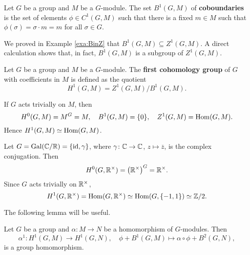 \begin{definition}
    Let $G$ be a group and $M$ be a $G$-module. The set
    $B^1(G,M)$ of \textbf{coboundaries} is the set 
    of elements $\phi\in C^1(G,M)$ such that there is a fixed 
    $m\in M$ such that
    $\phi(\sigma)=\sigma\cdot m=m$ for all $\sigma\in G$.
\end{definition}

We proved in Example \ref{exa:BinZ} that  
$B^1(G,M)\subseteq Z^1(G,M)$. A direct calculation shows that, in fact, 
$B^1(G,M)$ is a subgroup of $Z^1(G,M)$. 

\begin{definition}
    Let $G$ be a group and $M$ be a $G$-module. The 
    \textbf{first cohomology group} of $G$ with coefficients
    in $M$ is defined as the quotient
    \[
    H^1(G,M)=Z^1(G,M)/B^1(G,M).
    \]
\end{definition}

\begin{example}
    If $G$ acts trivially on $M$, then 
    \[
    H^0(G,M)=M^G=M,
    \quad 
    B^1(G,M)=\{0\},
    \quad 
    Z^1(G,M)=\operatorname{Hom}(G,M).
    \]
    Hence 
    $H^1(G,M)\simeq\operatorname{Hom}(G,M)$.
\end{example}

\begin{example}
    Let $G=\operatorname{Gal}(\mathbb{C}/\mathbb{R})=\{\operatorname{id},\gamma\}$, where $\gamma\colon\mathbb{C}\to\mathbb{C}$, $z\mapsto\overline{z}$, is the complex conjugation. Then
    \[
    H^0(G,\mathbb{R}^\times)=\left(\mathbb{R}^\times\right)^G=\mathbb{R}^\times.
    \]
    Since $G$ acts trivially on $\mathbb{R}^\times$, 
    \[
    H^1(G,\mathbb{R}^\times)=\operatorname{Hom}(G,\mathbb{R}^\times)\simeq\operatorname{Hom}(G,\{-1,1\})\simeq\mathbb{Z}/2.
    \]
\end{example}

The following lemma will be useful. 

\begin{lemma}
\label{lem:H1_maps}
    Let $G$ be a group and 
    $\alpha\colon M\to N$ be a homomorphism of $G$-modules. 
    Then 
    \[
    \alpha^1\colon H^1(G,M)\to H^1(G,N),\quad 
    \phi+B^1(G,M)\mapsto \alpha\circ\phi+B^2(G,N),
    \]
    is a group homomorphism. 
\end{lemma}

